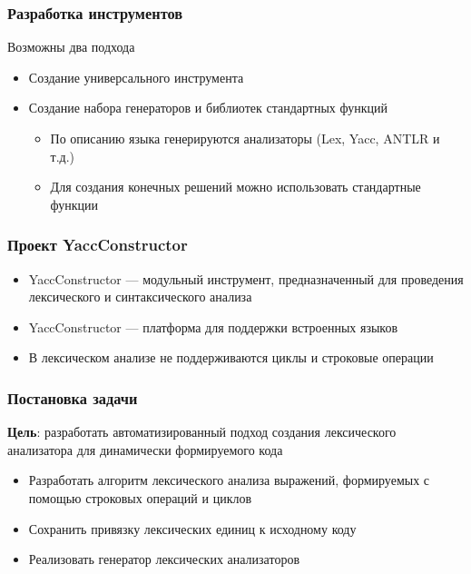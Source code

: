 \documentclass{beamer}
\begin{document}
\begin{frame}
    \transwipe[direction=90]
    \frametitle{Разработка инструментов}
    Возможны два подхода  
    \begin{itemize}
      \item Создание универсального инструмента
      \item Создание набора генераторов и библиотек стандартных функций
      \begin{itemize}
        \item По описанию языка генерируются анализаторы (Lex, Yacc, ANTLR и т.д.) 
        \item Для создания конечных решений можно использовать стандартные функции
      \end{itemize}
    \end{itemize}
\end{frame}

\begin{frame}
\transwipe[direction=90]
\frametitle{Проект YaccConstructor}
\begin{itemize}
\item YaccConstructor --- модульный инструмент, предназначенный для проведения лексического и синтаксического анализа  
\item YaccConstructor --- платформа для поддержки встроенных языков
\newline
\item В лексическом анализе не поддерживаются циклы и строковые операции
\end{itemize}
\end{frame}


\begin{frame}
\transwipe[direction=90]
\frametitle{Постановка задачи}
\textbf{Цель}: разработать автоматизированный подход создания лексического анализатора для динамически формируемого кода

\begin{itemize}
\item Разработать алгоритм лексического анализа выражений, формируемых с помощью строковых операций и циклов
\item Сохранить привязку лексических единиц к исходному коду
\item Реализовать генератор лексических анализаторов
\end{itemize}
\end{frame}
\end{document}
